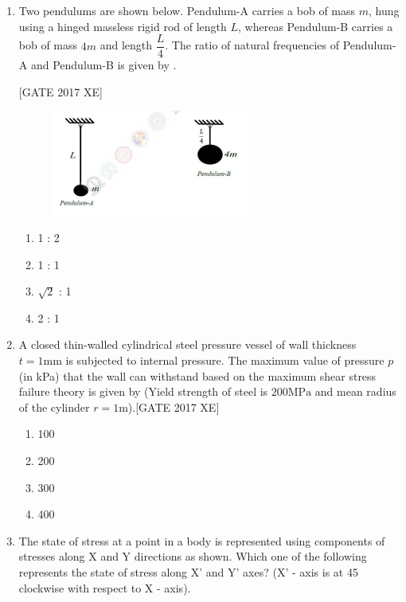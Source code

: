\documentclass[journal,12pt,onecolumn]{IEEEtran}
\theoremstyle{remark}
\begin{document}
\begin{enumerate}
\item Two pendulums are shown below. Pendulum-A carries a bob of mass $m$, hung using a hinged massless rigid rod of length $L$, whereas Pendulum-B carries a bob of mass $4m$ and length $\dfrac{L}{4}$. The ratio of natural frequencies of Pendulum-A and Pendulum-B is given by \underline{\hspace{2cm}}.

\hfill [GATE 2017 XE]

\begin{figure}[H]
    \centering
    \includegraphics[width=0.5\linewidth]{figs/fig14.png}
    \caption{}
    \label{fig:fig14}
\end{figure}
\begin{multicols}{2}
\begin{enumerate}
    \item 1 : 2  
    \item 1 : 1  
    \item $\sqrt{2}$ : 1  
    \item 2 : 1  
\end{enumerate}
\end{multicols}
\item A closed thin-walled cylindrical steel pressure vessel of wall thickness $t=1\text{mm}$ is subjected to internal pressure. The maximum value of pressure $p$ (in kPa) that the wall can withstand based on the maximum shear stress failure theory is given by (Yield strength of steel is $200\text{MPa}$ and mean radius of the cylinder $r = 1\text{m}$).\hfill [GATE 2017 XE]

\begin{multicols}{4}
\begin{enumerate}
    \item 100
    \item 200
    \item 300
    \item 400
\end{enumerate}
\end{multicols}



\item The state of stress at a point in a body is represented using components of stresses along X and Y directions as shown. Which one of the following represents the state of stress along X' and Y' axes? (X' - axis is at 45\textdegree{} clockwise with respect to X - axis).


\end{enumerate}
\end{document}
